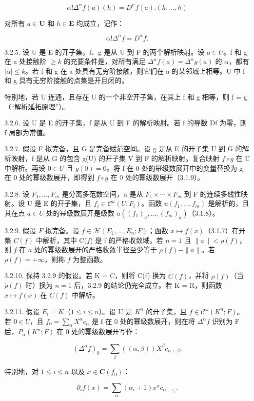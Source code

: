 \[
\alpha ! \Delta^ {\alpha} f (a) (h) = D ^ {\alpha} f (a). (h, \dots , h)
\]

对所有 \(a \in \mathbf{U}\) 和 \(h \in \mathbf{E}\) 均成立，记作：

\[
\alpha ! \Delta^ {\alpha} f = D ^ {\alpha} f.
\]

3.2.5. 设 U 是 E 的开子集，f、g 是从 U 到 F 的两个解析映射。设 \(a \in U\)。f 和 g 在 a 处接触阶 \(\geqslant k\) 的充要条件是，对所有满足 \(\Delta^{\alpha}f(a) = \Delta^{\alpha}g(a)\) 的 \(\alpha\)，都有 \(|\alpha| \leqslant k\)。若 f 和 g 在 a 处具有无穷阶接触，则它们在 a 的某邻域上相等。U 中 f 和 g 具有无穷阶接触的点集是开且闭的。

特别地，若 U 连通，且存在 U 的一个非空开子集，在其上 f 和 g 相等，则 f = g（“解析延拓原理”）。

3.2.6. 设 U 是 E 的开子集，f 是从 U 到 F 的解析映射。若 f 的导数 Df 为零，则 f 局部为常值。

3.2.7. 假设 F 拟完备，且 G 是完备赋范空间。设 g 是从 E 的开子集 U 到 G 的解析映射，f 是从 G 的包含 g(U) 的开子集 V 到 F 的解析映射。复合映射 \(f \circ g\) 在 U 中解析。再设 \(0 \in U\) 且 \(g(0) = 0\)。将 f 在 0 处的幂级数展开中的变量替换为 g 在 0 处的幂级数展开，即得到 \(f \circ g\) 在 0 处的幂级数展开（3.1.9）。

3.2.8. 设 \(F_{1},\ldots,F_{m}\) 是分离多范数空间，u 是从 \(F_{1}\times\cdots\times F_{m}\) 到 F 的连续多线性映射。设 U 是 E 的开子集，且 \(f_{i}\in\mathcal{C}^{\omega}(U;F_{i})\)。函数 \(u(f_{1},\ldots,f_{m})\) 是解析的，且其在点 \(a\in U\) 处的幂级数展开是级数 \(u((f_{1})_{a},\ldots,(f_{m})_{a})\)（3.1.8）。

3.2.9. 假设 \(F\) 拟完备。设 \(f \in \mathcal{H}(E_1, \ldots, E_n; F)\)；函数 \(x \mapsto f(x)\)（3.1.7）在开集 \(C(f)\) 中解析，其中 C(\(f\)) 是 f 的严格收敛域。若 \(n = 1\) 且 \(\|a\| < \rho(f)\)，则 \(f\) 在 \(a\) 处的幂级数展开的严格收敛半径至少等于 \(\rho(f) - \|a\|\)。若 \(\rho(f) = +\infty\)，则称 \(f\) 为整函数。

3.2.10. 保持 3.2.9 的假设。若 K = C，则将 C(f) 换为 \(\tilde{C}(f)\)，并将 \(\rho(f)\)（当 \(\tilde{\rho}(f)\) 时）换为 \(n = 1\) 后，3.2.9 的结论仍完全成立。若 K = R，则函数 \(x \mapsto f(x)\) 在 \(\tilde{C}(f)\) 中解析。

3.2.11. 假设 \(E_{i} = K\)（\(1 \leqslant i \leqslant n\)）。设 U 是 \(K^{n}\) 的开子集，且 \(f \in \mathcal{C}^{\omega}(K^{n}; F)\)。若 \(0 \in U\)，且 \(f_{0} = \sum_{\alpha} X^{\alpha} c_{\alpha}\) 是 f 在 0 处的幂级数展开，则在将 \(\Delta^{\alpha} f\) 识别为 F 后，\(P_{\alpha}(K^{n}; F)\) 在 0 处的幂级数展开写作：

\[
(\Delta^ {\alpha} f) _ {0} = \sum_ {\beta} ((\alpha , \beta)) X ^ {\beta} c _ {\alpha + \beta}.
\]

特别地，对 \(1 \leqslant i \leqslant n\) 以及 \(x \in \mathbf{C}(f_0)\)：

\[
\partial_ {i} f (x) = \sum_ {\alpha} (\alpha_ {i} + 1) x ^ {\alpha} c _ {\alpha + \varepsilon_ {i}}.
\]

